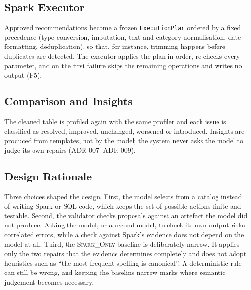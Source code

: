 \subsection{Spark Executor}
Approved recommendations become a frozen \texttt{ExecutionPlan} ordered by a fixed precedence (type conversion, imputation, text and category normalisation, date formatting, deduplication), so that, for instance, trimming happens before duplicates are detected. The executor applies the plan in order, re-checks every parameter, and on the first failure skips the remaining operations and writes no output (P5).

\subsection{Comparison and Insights}
The cleaned table is profiled again with the same profiler and each issue is classified as resolved, improved, unchanged, worsened or introduced. Insights are produced from templates, not by the model; the system never asks the model to judge its own repairs (ADR-007, ADR-009).

\subsection{Design Rationale}
Three choices shaped the design. First, the model selects from a catalog instead of writing Spark or SQL code, which keeps the set of possible actions finite and testable. Second, the validator checks proposals against an artefact the model did not produce. Asking the model, or a second model, to check its own output risks correlated errors, while a check against Spark's evidence does not depend on the model at all. Third, the \textsc{Spark\_Only} baseline is deliberately narrow. It applies only the two repairs that the evidence determines completely and does not adopt heuristics such as ``the most frequent spelling is canonical''. A deterministic rule can still be wrong, and keeping the baseline narrow marks where semantic judgement becomes necessary.
